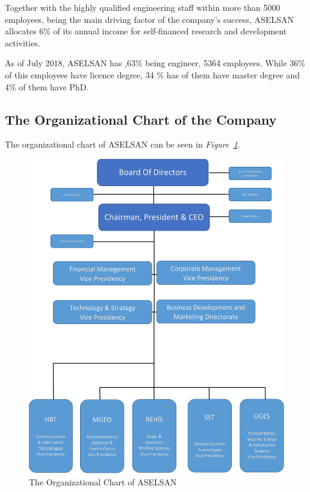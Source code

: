 	Together with the highly qualified engineering staff within more than 5000 employees, being the main driving factor of the company's success, ASELSAN allocates 6\% of its annual income for self-financed research and development activities.
	
 As of July 2018, ASELSAN has ,63\% being engineer, 5364 employees. While 36\% of this employees have licence degree, 34 \% has of them have master degree and 4\% of them have PhD.
	
	
\vfill
\subsection{The Organizational Chart of the Company}
\-
\indent
The organizational chart of ASELSAN can be seen in \textit{Figure~\ref{fig:orgc}}.

\begin{figure}[H]
\center
\setlength{\unitlength}{\textwidth} 
\includegraphics[width=0.93\unitlength]{organizasyon4}
\caption{\label{fig:orgc}The Organizational Chart of ASELSAN }
\end{figure}

